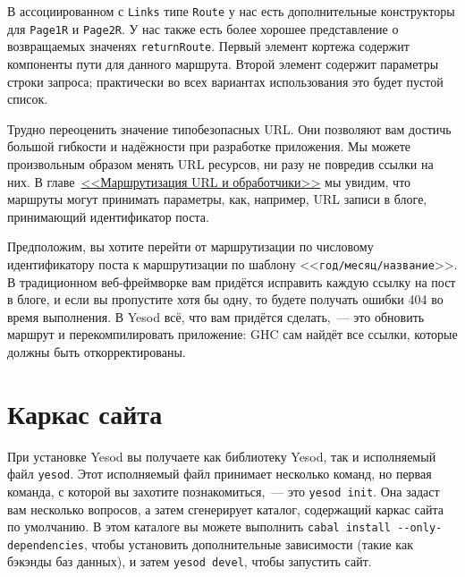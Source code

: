 В ассоциированном с \lstinline!Links! типе \lstinline!Route! у нас есть дополнительные
конструкторы для \lstinline!Page1R! и \lstinline!Page2R!. У нас также есть более хорошее
представление о возвращаемых значенях \lstinline!returnRoute!. Первый элемент кортежа содержит
компоненты пути для данного маршрута. Второй элемент содержит параметры строки запроса;
практически во всех вариантах использования это будет пустой список.

Трудно переоценить значение типобезопасных URL. Они позволяют вам достичь большой гибкости
и надёжности при разработке приложения. Мы можете произвольным образом менять URL
ресурсов, ни разу не повредив ссылки на них. В главе~\hyperref[chap:routing]{<<Маршрутизация
  URL и обработчики>>} мы увидим, что маршруты могут принимать параметры, как, например,
URL записи в блоге, принимающий идентификатор поста.

Предположим, вы хотите перейти от маршрутизации по числовому идентификатору поста к
маршрутизации по шаблону <<\texttt{год/месяц/название}>>. В традиционном веб-фреймворке
вам придётся исправить каждую ссылку на пост в блоге, и если вы пропустите хотя бы одну,
то будете получать ошибки 404 во время выполнения. В Yesod всё, что вам придётся сделать,~---
это обновить маршрут и перекомпилировать приложение: GHC сам найдёт все ссылки,
которые должны быть откорректированы.

\section{Каркас сайта}

При установке Yesod вы получаете как библиотеку Yesod, так и исполняемый файл
\lstinline!yesod!. Этот исполняемый файл принимает несколько команд, но первая команда, с
которой вы захотите познакомиться,~--- это \lstinline!yesod init!. Она задаст вам
несколько вопросов, а затем сгенерирует каталог, содержащий каркас сайта по умолчанию. В
этом каталоге вы можете выполнить \lstinline'cabal install --only-dependencies', чтобы
установить дополнительные зависимости (такие как бэкэнды баз данных), и затем
\lstinline'yesod devel', чтобы запустить сайт.

